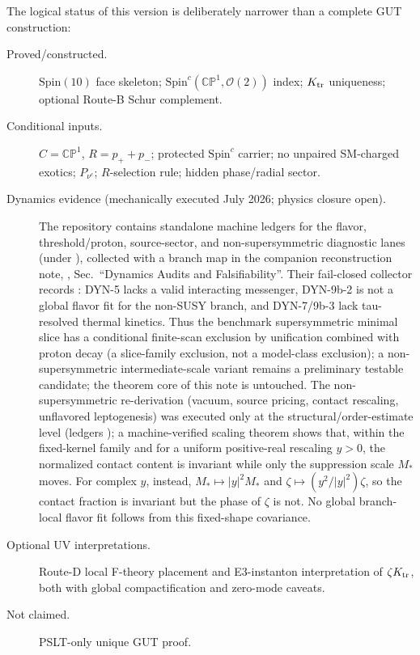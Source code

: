 \documentclass[
  aps,
  prd,
  preprint,
  nofootinbib,
  superscriptaddress,
  longbibliography
]{revtex4-2}
\newcommand{\Spin}{\mathrm{Spin}}
\newcommand{\CP}{\mathbb{CP}}
\newcommand{\cO}{\mathcal{O}}
\begin{document}
The logical status of this version is deliberately narrower than a complete
GUT construction:
\begin{description}
\item[Proved/constructed.]
\(\Spin(10)\) face skeleton; \(\Spin^c(\CP^1,\cO(2))\) index;
\(K_{\rm tr}\) uniqueness; optional Route-B Schur complement.
\item[Conditional inputs.]
\(C=\CP^1\), \(R=p_++p_-\); protected \(\Spin^c\) carrier;
no unpaired SM-charged exotics; \(P_{\nu^c}\); \(R\)-selection rule;
hidden phase/radial sector.
\item[Dynamics evidence (mechanically executed July 2026; physics closure
open).]
The repository contains standalone machine ledgers for the flavor,
threshold/proton, source-sector, and non-supersymmetric diagnostic lanes
(under ), collected with a branch map in the
companion reconstruction note,
, Sec.~``Dynamics
Audits and Falsifiability''.  Their fail-closed collector records
: DYN-5 lacks a valid interacting
messenger, DYN-9b-2 is not a global flavor fit for the non-SUSY branch, and
DYN-7/9b-3 lack tau-resolved thermal kinetics.  Thus the benchmark
supersymmetric minimal slice has a conditional finite-scan exclusion by
unification combined with proton decay (a slice-family exclusion, not a
model-class exclusion); a non-supersymmetric intermediate-scale variant
remains a preliminary testable candidate; the theorem core of
this note is untouched.  The non-supersymmetric re-derivation
(vacuum, source pricing, contact rescaling, unflavored leptogenesis) was
executed only at the structural/order-estimate level (ledgers
); a machine-verified scaling theorem
shows that, within the fixed-kernel family and for a uniform positive-real
rescaling \(y>0\), the normalized contact content is invariant while only
the suppression scale \(M_*\) moves.  For complex \(y\), instead,
\(M_*\mapsto |y|^2M_*\) and
\(\zeta\mapsto (y^2/|y|^2)\zeta\), so the contact fraction is invariant but
the phase of \(\zeta\) is not.  No global branch-local flavor fit follows
from this fixed-shape covariance.
\item[Optional UV interpretations.]
Route-D local F-theory placement and E3-instanton interpretation of
\(\zeta K_{\rm tr}\), both with global compactification and zero-mode caveats.
\item[Not claimed.]
PSLT-only unique GUT proof.
\end{description}
\end{document}
